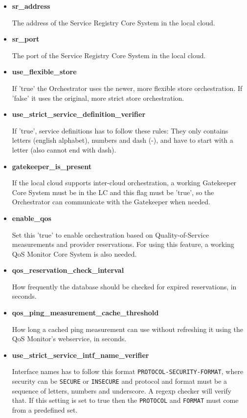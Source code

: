 \documentclass[a4paper]{arrowhead}
\begin{document}
\begin{itemize}
    \item \textbf{sr\_address}
  
    The address of the Service Registry Core System in the local cloud.
    
    \item \textbf{sr\_port}
  
    The port of the Service Registry Core System in the local cloud.
    
    \item \textbf{use\_flexible\_store}
  
    If 'true' the Orchestrator uses the newer, more flexible store orchestration. If 'false' it uses the original, more strict store orchestration.
          
    \item \textbf{use\_strict\_service\_definition\_verifier}
  
    If 'true', service definitions has to follow these rules: They only contains letters (english alphabet), numbers and dash (-), and have to start with a letter (also cannot end with dash).
    
    \item \textbf{gatekeeper\_is\_present}

    If the local cloud supports inter-cloud orchestration, a working Gatekeeper Core System must be in the LC and this flag must be 'true', so the Orchestrator can communicate with the Gatekeeper when needed.
  
    \item \textbf{enable\_qos}
  
    Set this 'true' to enable orchestration based on Quality-of-Service measurements and provider reservations. For using this feature, a working QoS Monitor Core System is also needed.
    
    \item \textbf{qos\_reservation\_check\_interval}
  
    How frequently the database should be checked for expired reservations, in seconds.
    
    \item \textbf{qos\_ping\_measurement\_cache\_threshold}
  
    How long a cached ping measurement can use without refreshing it using the QoS Monitor's webservice, in seconds.

    \item \textbf{use\_strict\_service\_intf\_name\_verifier}
  
    Interface names has to follow this format \texttt{PROTOCOL-SECURITY-FORMAT}, where security can be \texttt{SECURE} or \texttt{INSECURE} and protocol and format must be a sequence of letters, numbers and underscore. A regexp checker will verify that. If this setting is set to true then the \texttt{PROTOCOL} and \texttt{FORMAT} must come from a predefined set.
       
\end{itemize}
\end{document}
